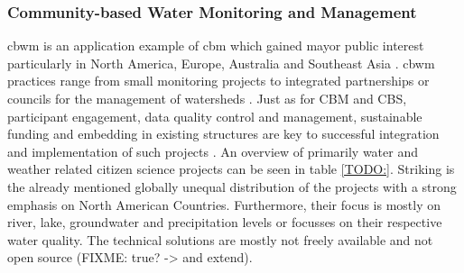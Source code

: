 \subsubsection*{Community-based Water Monitoring and Management}\label{subsubsec:cbwm}

\acrfull*{cbwm} is an application example of \acrshort*{cbm} which gained mayor public interest particularly in North America, Europe, Australia and Southeast Asia \autocite{kirschkeCitizenScienceProjects2022, koehlerCitizenParticipationCollaborative2008, livinglakescanadaElevatingCommunityBased2018}. \acrshort*{cbwm} practices range from small monitoring projects to integrated partnerships or councils for the management of watersheds \autocite{westonCommunityBasedWaterMonitoring2015}. Just as for CBM and CBS, participant engagement, data quality control and management, sustainable funding and embedding in existing structures are key to successful integration and implementation of such projects \autocite{allenCommunityBasedWaterMonitoring2018,livinglakescanadaCommunityBasedWaterMonitoring2018,westonCommunityBasedWaterMonitoring2015}.
An overview of primarily water and weather related citizen science projects can be seen in table \ref*{TODO:}. Striking is the already mentioned globally unequal distribution of the projects with a strong emphasis on North American Countries. Furthermore, their focus is mostly on river, lake, groundwater and precipitation levels or focusses on their respective water quality. The technical solutions are mostly not freely available and not open source (FIXME: true? -> and extend). 


